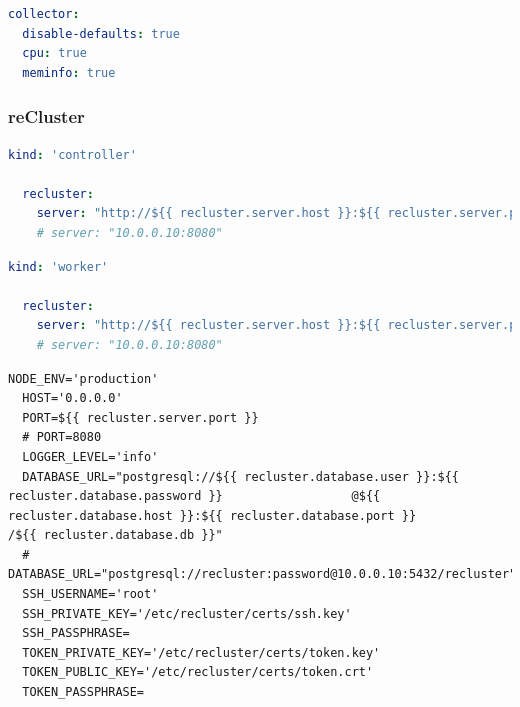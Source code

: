 
\begin{lstlisting}[language=yaml, alsoletter={.-}, morekeywords={[2]{collector, disable-defaults, cpu, meminfo}}, xleftmargin=\parindent, label={lst:node_exporter_config}, caption=TODO]
collector:
  disable-defaults: true
  cpu: true
  meminfo: true
\end{lstlisting}

\subsubsection{reCluster}
\label{subsubsec:implementation_installer_configuration_files_recluster}

\begin{lstlisting}[language=yaml, alsoletter={.}, morekeywords={[2]{kind, recluster, server}}, xleftmargin=\parindent, label={lst:recluster_controller_config}, caption=TODO]
  kind: 'controller'

  recluster:
    server: "http://${{ recluster.server.host }}:${{ recluster.server.port }}"
    # server: "10.0.0.10:8080"
\end{lstlisting}

\begin{lstlisting}[language=yaml, alsoletter={.}, morekeywords={[2]{kind, recluster, server}}, xleftmargin=\parindent, label={lst:recluster_worker_config}, caption=TODO]
  kind: 'worker'

  recluster:
    server: "http://${{ recluster.server.host }}:${{ recluster.server.port }}"
    # server: "10.0.0.10:8080"
\end{lstlisting}

\begin{lstlisting}[language=shell, alsoletter={_}, morestring={*[b]"}, morekeywords={[4]{NODE_ENV, HOST, PORT, LOGGER_LEVEL, DATABASE_URL, SSH_USERNAME, SSH_PRIVATE_KEY, SSH_PASSPHRASE, TOKEN_PRIVATE_KEY, TOKEN_PUBLIC_KEY, TOKEN_PASSPHRASE}}, xleftmargin=\parindent, label={lst:recluster_server_config}, caption=TODO]
  NODE_ENV='production'
  HOST='0.0.0.0'
  PORT=${{ recluster.server.port }}
  # PORT=8080
  LOGGER_LEVEL='info'
  DATABASE_URL="postgresql://${{ recluster.database.user }}:${{ recluster.database.password }}                  @${{ recluster.database.host }}:${{ recluster.database.port }}                                /${{ recluster.database.db }}"
  # DATABASE_URL="postgresql://recluster:password@10.0.0.10:5432/recluster"
  SSH_USERNAME='root'
  SSH_PRIVATE_KEY='/etc/recluster/certs/ssh.key'
  SSH_PASSPHRASE=
  TOKEN_PRIVATE_KEY='/etc/recluster/certs/token.key'
  TOKEN_PUBLIC_KEY='/etc/recluster/certs/token.crt'
  TOKEN_PASSPHRASE=
\end{lstlisting}

